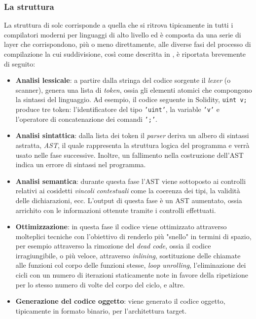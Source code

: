 \documentclass[12pt,a4paper,openright,oneside]{report}
\theoremstyle{definition}
\begin{document}
\subsubsection{La struttura}\label{impl:ov:solc:structure}
La struttura di solc corrisponde a quella che si ritrova tipicamente in tutti i compilatori moderni per linguaggi di alto livello ed \`{e} composta da una serie di layer che corrispondono, pi\`{u} o meno direttamente, alle diverse fasi del processo di compilazione la cui suddivisione, cos\`{i} come descritta in \cite{linguaggi,dragonBook}, \`{e} riportata brevemente di seguito:
\begin{itemize}
    \item \textbf{Analisi lessicale}: a partire dalla stringa del codice sorgente il \textit{lexer} (o scanner), genera una lista di \textit{token}, ossia gli elementi atomici che compongono la sintassi del linguaggio. Ad esempio, il codice seguente in Solidity, \texttt{uint v;} produce tre token: l'identificatore del tipo \texttt{'uint'}, la variable \texttt{'v'} e l'operatore di concatenazione dei comandi \texttt{';'}.
    \item \textbf{Analisi sintattica}: dalla lista dei token il \textit{parser} deriva un albero di sintassi astratta, \textit{AST}, il quale rappresenta la struttura logica del programma e verr\`{a} usato nelle fase successive. Inoltre, un fallimento nella costruzione dell'AST indica un errore di sintassi nel programma.
    \item \textbf{Analisi semantica}: durante questa fase l'AST viene sottoposto ai controlli relativi ai cosidetti \textit{vincoli contestuali} come la coerenza dei tipi, la validit\`{a} delle dichiarazioni, ecc. L'output di questa fase \`{e} un AST aumentato, ossia arrichito con le informazioni ottenute tramite i controlli effettuati.
    \item \textbf{Ottimizzazione}: in questa fase il codice viene ottimizzato attraverso molteplici tecniche con l'obiettivo di renderlo pi\`{u} "snello" in termini di spazio, per esempio attraverso la rimozione del \textit{dead code}, ossia il codice irragiungibile, o pi\`{u} veloce, attraverso \textit{inlining}, sostituzione delle chiamate alle funzioni col corpo delle funzioni stesse, \textit{loop unrolling}, l'eliminazione dei cicli con un numero di iterazioni staticamente note in favore della ripetizione per lo stesso numero di volte del corpo del ciclo, e altre.
    \item \textbf{Generazione del codice oggetto}: viene generato il codice oggetto, tipicamente in formato binario, per l'architettura target.
\end{itemize}
\end{document}
